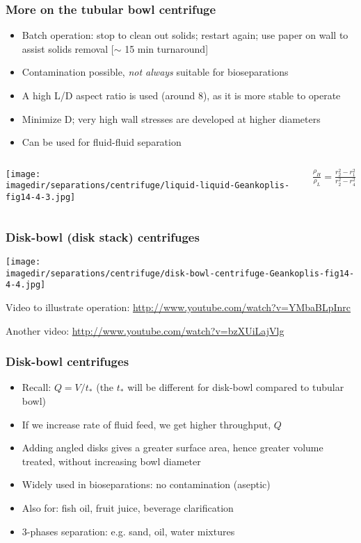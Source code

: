 \begin{frame}\frametitle{More on the tubular bowl centrifuge}
	\begin{itemize}
		\item	Batch operation: stop to clean out solids; restart again; use paper on wall to assist solids removal [$\sim$ 15 min turnaround]
		\item	Contamination possible, \emph{not always} suitable for bioseparations
		\item	A high L/D aspect ratio is used (around 8), as it is more stable to operate
		\item	Minimize D; very high wall stresses are developed at higher diameters
		\item	Can be used for fluid-fluid separation
	\end{itemize}
	\begin{columns}[c]
			\begin{center}
				\texttt{[image: \\imagedir/separations/centrifuge/liquid-liquid-Geankoplis-fig14-4-3.jpg]}
			\end{center}
				$\displaystyle \frac{\rho_H}{\rho_L} = \displaystyle \frac{r_2^2 - r_1^2}{r_2^2 - r_4^2}$
	\end{columns}
\end{frame}

\begin{frame}\frametitle{Disk-bowl (disk stack) centrifuges}
	\begin{center}
		\texttt{[image: \\imagedir/separations/centrifuge/disk-bowl-centrifuge-Geankoplis-fig14-4-4.jpg]}
	\end{center}

	\vspace{0pt}
	Video to illustrate operation: \href{http://www.youtube.com/watch?v=YMbaBLpInrc}{http://www.youtube.com/watch?v=YMbaBLpInrc}

	\vspace{2pt}
	{\tiny Another video: \href{http://www.youtube.com/watch?v=bzXUiLajVlg}{http://www.youtube.com/watch?v=bzXUiLajVlg}}

\end{frame}

\begin{frame}\frametitle{Disk-bowl centrifuges}
	\begin{itemize}
		\item	Recall: $Q = V / t_*$ (the $t_*$ will be different for disk-bowl compared to tubular bowl)
		\item	If we increase rate of fluid feed, we get higher throughput, $Q$
		\item	Adding angled disks gives a greater surface area, hence greater volume treated, without increasing bowl diameter
		\item	Widely used in bioseparations: no contamination (aseptic)
		\item	Also for: fish oil, fruit juice, beverage clarification
		\item	3-phases separation: e.g. sand, oil, water mixtures
	\end{itemize}
\end{frame}

